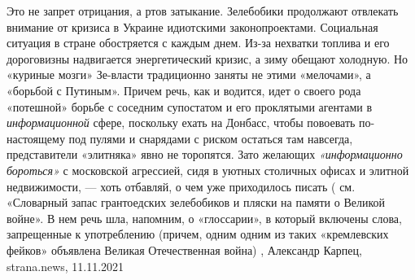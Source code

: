 Это не запрет отрицания, а ртов затыкание.  Зелебобики продолжают отвлекать
внимание от кризиса в Украине идиотскими законопроектами. Социальная ситуация в
стране обостряется с каждым днем. Из-за нехватки топлива и его дороговизны
надвигается энергетический кризис, а зиму обещают холодную. Но «куриные мозги»
Зе-власти традиционно заняты не этими «мелочами», а «борьбой с Путиным».
Причем речь, как и водится, идет о своего рода «потешной» борьбе с соседним
супостатом и его проклятыми агентами в \emph{информационной} сфере, поскольку ехать на
Донбасс, чтобы повоевать по-настоящему под пулями и снарядами с риском остаться
там навсегда, представители «элитняка» явно не торопятся. Зато желающих
\emph{«информационно бороться»} с московской агрессией, сидя в уютных столичных офисах
и элитной недвижимости, — хоть отбавляй, о чем уже приходилось писать ( см.
«Словарный запас грантоедских зелебобиков и пляски на памяти о Великой войне».
В нем речь шла, напомним, о «глоссарии», в который включены слова, запрещенные
к употреблению (причем, одним одним из таких «кремлевских фейков» объявлена
Великая Отечественная война)
, 
Александр Карпец, strana.news, 11.11.2021
